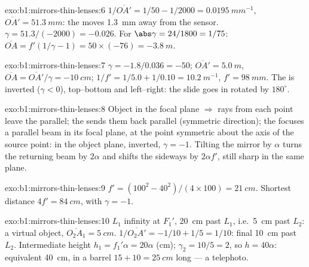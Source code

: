 \begin{solution}{exo:b1:mirrors-thin-lenses:6}
$1/\overline{OA'} = 1/50 - 1/2000 = \qty{0.0195}{mm^{-1}}$,
$\overline{OA'} = \qty{51.3}{mm}$: the  moves \qty{1.3}{mm} away from
the sensor. $\gamma = 51.3/(-2000) = -0.026$. For $\abs\gamma = 24/1800
= 1/75$: $\overline{OA} = f'(1/\gamma - 1) = 50 \times (-76) =
\qty{-3.8}{m}$.
\end{solution}

\begin{solution}{exo:b1:mirrors-thin-lenses:7}
$\gamma = -1.8/0.036 = -50$; $\overline{OA'} = \qty{5.0}{m}$,
$\overline{OA} = \overline{OA'}/\gamma = \qty{-10}{cm}$;
$1/f' = 1/5.0 + 1/0.10 = \qty{10.2}{m^{-1}}$, $f' = \qty{98}{mm}$. The
 is inverted ($\gamma < 0$), top--bottom and left--right: the slide
goes in rotated by $180^\circ$.
\end{solution}

\begin{solution}{exo:b1:mirrors-thin-lenses:8}
Object in the focal plane $\Rightarrow$ rays from each point leave the
 parallel; the  sends them back parallel (symmetric
direction); the  focuses a parallel beam in its focal plane, at the
point symmetric about the axis of the source point:  in the object
plane, inverted, $\gamma = -1$. Tilting the mirror by $\alpha$ turns the
returning beam by $2\alpha$ and shifts the  sideways by
$2\alpha f'$, still sharp in the same plane.
\end{solution}

\begin{solution}{exo:b1:mirrors-thin-lenses:9}
$f' = (100^2 - 40^2)/(4 \times 100) = \qty{21}{cm}$. Shortest distance
$4f' = \qty{84}{cm}$, with $\gamma = -1$.
\end{solution}

\begin{solution}{exo:b1:mirrors-thin-lenses:10}
$L_1$  infinity at $F_1'$, \qty{20}{cm} past $L_1$, i.e.\ \qty{5}{cm}
past $L_2$: a virtual object, $\overline{O_2A_1} = \qty{+5}{cm}$.
$1/\overline{O_2A'} = -1/10 + 1/5 = 1/10$: final  \qty{10}{cm}
past $L_2$. Intermediate  height $h_1 = f_1'\alpha = 20\alpha$ (cm);
$\gamma_2 = 10/5 = 2$, so $h = 40\alpha$: equivalent 
\qty{40}{cm}, in a barrel $15 + 10 = \qty{25}{cm}$ long --- a telephoto.
\end{solution}

